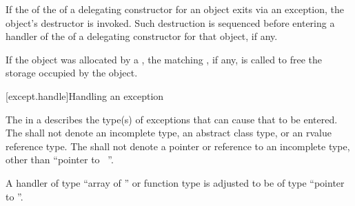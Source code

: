 \pnum
If the 
of the 
of a delegating constructor
for an object exits via
an exception, the object's destructor is invoked.
Such destruction is sequenced before entering a handler of the
 of a delegating constructor for that object, if any.

\pnum
\begin{note}
If the object was allocated by a ,
the matching ,
if any, is called to free the storage occupied by the object.
\end{note}


[except.handle]{Handling an exception}
%

\pnum
The
in a
describes the type(s) of exceptions that can cause
that
to be entered.
%
%
%
%
The
shall not denote an incomplete type, an abstract class type, or an rvalue reference type.
The
shall not denote a pointer or reference to an
incomplete type, other than ``pointer to \cv{}~''.

\pnum
A handler of type
%
``array of '' or
%
function type 
is adjusted to be of type
``pointer to ''.

